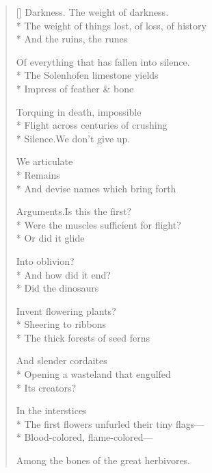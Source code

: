 \label{ch:mythological_bird}
\settowidth{\versewidth}{The first flowers unfurled their tiny flags---}
\begin{verse}[\versewidth]
Darkness. The weight of darkness.\\*
The weight of things lost, of loss, of history\\*
And the ruins, the runes

Of everything that has fallen into silence.\\*
The Solenhofen limestone yields\\*
Impress of feather \& bone

Torquing in death, impossible\\*
Flight across centuries of crushing\\*
Silence.\qquad We don't give up.

We articulate\\*
Remains\\*
And devise names which bring forth

Arguments.\quad Is this the first?\\*
Were the muscles sufficient for flight?\\*
Or did it glide

Into oblivion?\\*
And how did it end?\\*
Did the dinosaurs 

Invent flowering plants?\\*
Sheering to ribbons\\*
The thick forests of seed ferns

And slender cordaites\\*
Opening a wasteland that engulfed\\*
Its creators?

In the interstices\\*
The first flowers unfurled their tiny flags---\\*
Blood-colored, flame-colored---

Among the bones of the great herbivores.
\end{verse}
